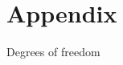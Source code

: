 \section{Appendix}

\begin{frame}[t]{Degrees of freedom}
  \begin{xtabular}{cc}
       
  \end{xtabular}
\end{frame}
